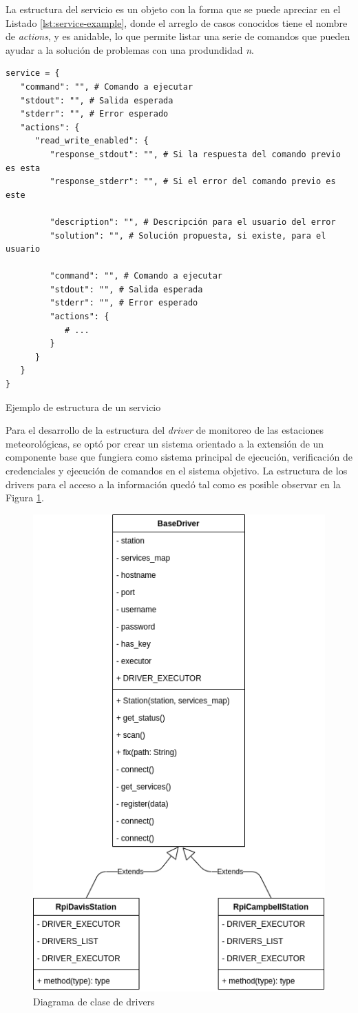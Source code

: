 La estructura del servicio es un objeto con la forma que se puede apreciar en el Listado \ref{lst:service-example}, donde el arreglo de casos conocidos tiene el nombre de \textit{actions}, y es anidable, lo que permite listar una serie de comandos que pueden ayudar a la solución de problemas con una produndidad \textit{n}.

\begin{listing}
\begin{verbatim}
service = {
   "command": "", # Comando a ejecutar
   "stdout": "", # Salida esperada
   "stderr": "", # Error esperado
   "actions": {
      "read_write_enabled": {
         "response_stdout": "", # Si la respuesta del comando previo es esta
         "response_stderr": "", # Si el error del comando previo es este

         "description": "", # Descripción para el usuario del error
         "solution": "", # Solución propuesta, si existe, para el usuario

         "command": "", # Comando a ejecutar
         "stdout": "", # Salida esperada
         "stderr": "", # Error esperado
         "actions": {
            # ...
         }
      }
   }
}
\end{verbatim}
\caption{Ejemplo de estructura de un servicio}
\label{lst:service-example}
\end{listing}

Para el desarrollo de la estructura del \textit{driver} de monitoreo de las estaciones meteorológicas, se optó por crear un sistema orientado a la extensión de un componente base que fungiera como sistema principal de ejecución, verificación de credenciales y ejecución de comandos en el sistema objetivo. La estructura de los drivers para el acceso a la información quedó tal como es posible observar en la Figura \ref{fig:diagrama_clase_drivers}.

\begin{figure}[!ht]
	\centering
	\includegraphics[width=0.2\linewidth]{images/diagrams/classes/drivers.drawio.png}
	\caption{Diagrama de clase de drivers}
	\label{fig:diagrama_clase_drivers}
\end{figure}

